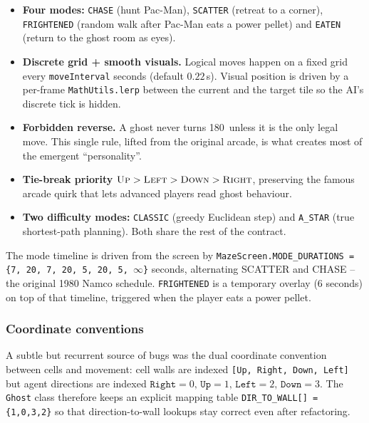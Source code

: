\documentclass[11pt,a4paper]{article}
\begin{document}
\begin{itemize}[leftmargin=1.3em,itemsep=1pt]
  \item \textbf{Four modes:} \texttt{CHASE} (hunt Pac-Man),
        \texttt{SCATTER} (retreat to a corner),
        \texttt{FRIGHTENED} (random walk after Pac-Man eats a power
        pellet) and \texttt{EATEN} (return to the ghost room as eyes).
  \item \textbf{Discrete grid + smooth visuals.} Logical moves happen on
        a fixed grid every \texttt{moveInterval} seconds (default
        $0.22\,$s). Visual position is driven by a per-frame
        \texttt{MathUtils.lerp} between the current and the target tile
        so the AI's discrete tick is hidden.
  \item \textbf{Forbidden reverse.} A ghost never turns
        180\textdegree\ unless it is the only legal move. This single
        rule, lifted from the original arcade, is what creates most of
        the emergent ``personality''.
  \item \textbf{Tie-break priority} \(\textsc{Up} > \textsc{Left} >
        \textsc{Down} > \textsc{Right}\), preserving the famous arcade
        quirk that lets advanced players read ghost behaviour.
  \item \textbf{Two difficulty modes:} \texttt{CLASSIC} (greedy
        Euclidean step) and \texttt{A\_STAR} (true shortest-path
        planning). Both share the rest of the contract.
\end{itemize}

The mode timeline is driven from the screen by
\texttt{MazeScreen.MODE\_DURATIONS = \{7, 20, 7, 20, 5, 20, 5, $\infty$\}}
seconds, alternating SCATTER and CHASE -- the original 1980 Namco
schedule. \texttt{FRIGHTENED} is a temporary overlay (6 seconds) on top
of that timeline, triggered when the player eats a power pellet.

\subsubsection{Coordinate conventions}

A subtle but recurrent source of bugs was the dual coordinate convention
between cells and movement: cell walls are indexed
\texttt{[Up, Right, Down, Left]} but agent directions are indexed
\(\texttt{Right}{=}0,\,\texttt{Up}{=}1,\,\texttt{Left}{=}2,\,
\texttt{Down}{=}3\). The \texttt{Ghost} class therefore keeps an
explicit mapping table \texttt{DIR\_TO\_WALL[]\,=\,\{1,0,3,2\}} so that
direction-to-wall lookups stay correct even after refactoring.
\end{document}
